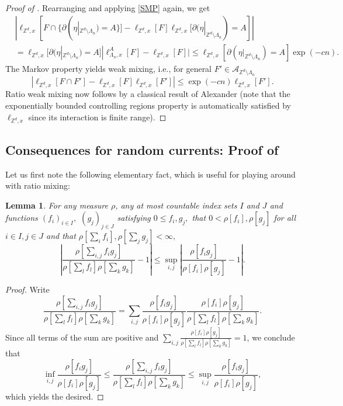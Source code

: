 \documentclass[article,11pt,reqno]{amsart}
\newtheorem{lemma}[theorem]{Lemma}
\begin{document}
\begin{proof}[Proof of ]
Rearranging and applying \eqref{SMP} again, we get
\begin{align*}
&|\ell_{\mathbb{Z}^d,x}[F\cap \{\partial(\eta|_{\mathbb{Z}^d\setminus \Lambda_n})=A\}]-\ell_{\mathbb{Z}^d,x}[F]\ell_{\mathbb{Z}^d,x}[\partial(\eta|_{\mathbb{Z}^d\setminus \Lambda_n})=A]| \\
&=\ell_{\mathbb{Z}^d,x}[\partial(\eta|_{\mathbb{Z}^d\setminus \Lambda_n})=A]|\ell^A_{\Lambda_n,x}[F]-\ell_{\mathbb{Z}^d,x}[F]|
\leq \ell_{\mathbb{Z}^d,x}[\partial(\eta|_{\mathbb{Z}^d\setminus \Lambda_n})=A]\exp(-cn).
\end{align*}
The Markov property yields weak mixing, i.e., for general $F'\in \mathcal{A}_{\mathbb{Z}^d\setminus \Lambda_n}$
$$
|\ell_{\mathbb{Z}^d,x}[F\cap F']-\ell_{\mathbb{Z}^d,x}[F]\ell_{\mathbb{Z}^d,x}[F']|\leq \exp(-cn) \ell_{\mathbb{Z}^d,x}[F']. 
$$
 Ratio weak mixing now follows by a classical result of Alexander \cite[Theorem 3.3]{alexander1998weak} (note that the exponentially bounded controlling regions property is automatically satisfied by $\ell_{\mathbb{Z}^d,x}$ since its interaction is finite range). 
\end{proof}


\subsection{Consequences for random currents: Proof of \texorpdfstring{}{Theorem \ref*{thm:Free-mix}}}\label{sec:Inf_Rel}

 Let us first note the following elementary fact, which is useful for playing around with ratio mixing:

\begin{lemma} \label{Convexity_Lemma}
For any measure $\rho$, any at most countable index sets $I$ and $J$ and functions $(f_i)_{i\in I},$ $(g_j)_{j\in J}$ satisfying $0\leq f_i,g_j,$  that $0<\rho[ f_i],\rho[g_j]$ for all $i\in I,j\in J$ and that $\rho[\sum_i f_i],\rho[\sum_jg_j]<\infty,$ 
$$
\left|\frac{\rho [\sum_{i,j} f_ig_j]}{\rho[\sum_l f_l]\rho[\sum_kg_k]}-1\right|\leq \sup_{i,j}\left|\frac{\rho [f_ig_j]}{\rho[f_i]\rho[g_j]}-1\right|.
$$
\end{lemma}
\begin{proof}
Write
$$
\frac{\rho [\sum_{i,j} f_ig_j]}{\rho[\sum_l f_l]\rho[\sum_kg_k]}=\sum_{i,j} \frac{\rho[f_ig_j]}{\rho[f_i]\rho[g_j]} \frac{\rho[f_i]\rho[g_j]}{\rho[\sum_lf_l]\rho[\sum_kg_k]}.
$$
Since all terms of the sum are positive and $\sum_{i,j} \frac{\rho[f_i]\rho[g_j]}{\rho[{\sum_l f_l}]\rho[\sum_kg_k]}=1$, we conclude that
$$
\inf_{i,j}\frac{\rho[f_ig_j]}{\rho[f_i]\rho[g_j]}\leq \frac{\rho [\sum_{i,j} f_ig_j]}{\rho[\sum_l f_l]\rho[\sum_kg_k]}\leq \sup_{i,j} \frac{\rho[f_ig_j]}{\rho[f_i]\rho[g_j]},
$$
which yields the desired.
\end{proof}
\end{document}
